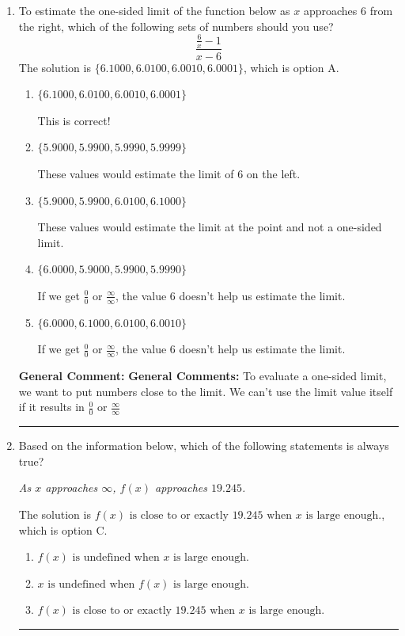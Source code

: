 \documentclass{extbook}[14pt]
\newcommand{\litem}[1]{\item #1

\rule{\textwidth}{0.4pt}}
\begin{document}
\begin{enumerate}\litem{
To estimate the one-sided limit of the function below as $x$ approaches 6 from the right, which of the following sets of numbers should you use?
\[ \frac{\frac{6}{x} - 1}{x - 6} \]The solution is \( \{ 6.1000, 6.0100, 6.0010, 6.0001 \} \), which is option A.\begin{enumerate}[label=\Alph*.]
\item \( \{ 6.1000, 6.0100, 6.0010, 6.0001 \} \)

This is correct!
\item \( \{ 5.9000, 5.9900, 5.9990, 5.9999 \} \)

These values would estimate the limit of 6 on the left.
\item \( \{ 5.9000, 5.9900, 6.0100, 6.1000 \} \)

These values would estimate the limit at the point and not a one-sided limit.
\item \( \{ 6.0000, 5.9000, 5.9900, 5.9990 \} \)

If we get $\frac{0}{0}$ or $\frac{\infty}{\infty}$, the value 6 doesn't help us estimate the limit.
\item \( \{ 6.0000, 6.1000, 6.0100, 6.0010 \} \)

If we get $\frac{0}{0}$ or $\frac{\infty}{\infty}$, the value 6 doesn't help us estimate the limit.
\end{enumerate}

\textbf{General Comment:} \textbf{General Comments:} To evaluate a one-sided limit, we want to put numbers close to the limit. We can't use the limit value itself if it results in $\frac{0}{0}$ or $\frac{\infty}{\infty}$
}
\litem{
Based on the information below, which of the following statements is always true?

\begin{center}
    \textit{ As $x$ approaches $\infty$, $f(x)$ approaches $19.245$. }
\end{center}
The solution is \( f(x) \text{ is close to or exactly } 19.245 \text{ when } x \text{ is large enough}. \), which is option C.\begin{enumerate}[label=\Alph*.]
\item \( f(x) \text{ is undefined when } x \text{ is large enough}. \)


\item \( x \text{ is undefined when } f(x) \text{ is large enough}. \)


\item \( f(x) \text{ is close to or exactly } 19.245 \text{ when } x \text{ is large enough}. \)



\end{enumerate}}
\end{enumerate}
\end{document}
